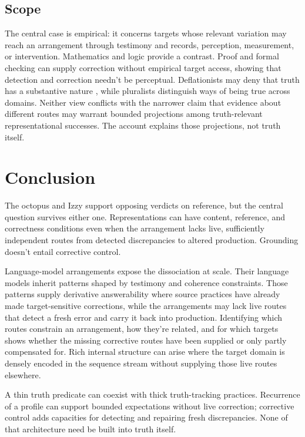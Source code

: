 \documentclass[12pt]{article}
\newcommand{\transitionpagehead}[1]{%
  \fancypagestyle{ttptransition}{%
    \fancyhf{}%
    \fancyhead[L]{\small\scshape #1}%
    \fancyhead[R]{\small\thepage}%
    \renewcommand{\headrulewidth}{0pt}%
  }%
  \thispagestyle{ttptransition}%
}
\begin{document}
\subsection{Scope}

The central case is empirical: it concerns targets whose relevant variation may reach an
arrangement through testimony and records, perception, measurement, or intervention.
Mathematics and logic provide a contrast. Proof and formal checking can supply correction
without empirical target access, showing that detection and correction needn't be
perceptual. Deflationists
may deny that truth has a substantive nature \citep{horwich_1998_truth}, while pluralists
distinguish ways of being true across domains. Neither view conflicts with the narrower
claim that evidence about different routes may warrant bounded projections among
truth-relevant representational successes. The account explains those projections, not
truth itself.

\transitionpagehead{6\quad Comparisons and objections}
\section{Conclusion}\label{sec:conclusion}

The octopus and Izzy support opposing verdicts on reference, but the central question
survives either one. Representations can have content, reference, and correctness
conditions even when the arrangement lacks live, sufficiently independent
routes from detected discrepancies to altered production. Grounding doesn't entail
corrective control.

Language-model arrangements expose the dissociation at scale. Their language models inherit
patterns shaped by testimony and coherence constraints. Those patterns supply derivative
answerability where source practices have already made target-sensitive corrections, while
the arrangements may lack live routes that detect a fresh error and carry it back into
production. Identifying which routes constrain an arrangement, how they're related, and
for which targets shows whether the missing corrective routes have been supplied or only
partly compensated for. Rich internal structure can arise where
the target domain is densely encoded in the sequence stream without supplying those live
routes elsewhere.

A thin truth predicate can coexist with thick truth-tracking practices. Recurrence of a
profile can support bounded expectations without live correction; corrective control adds
capacities for detecting and repairing fresh discrepancies. None of that architecture need
be built into truth itself.
\end{document}
